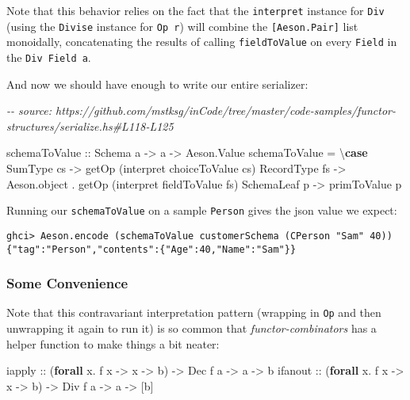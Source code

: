 \documentclass[]{article}
\newenvironment{Shaded}{}{}
\newcommand{\CommentTok}[1]{\textcolor[rgb]{0.38,0.63,0.69}{\textit{#1}}}
\newcommand{\DataTypeTok}[1]{\textcolor[rgb]{0.56,0.13,0.00}{#1}}
\newcommand{\KeywordTok}[1]{\textcolor[rgb]{0.00,0.44,0.13}{\textbf{#1}}}
\newcommand{\NormalTok}[1]{#1}
\newcommand{\OperatorTok}[1]{\textcolor[rgb]{0.40,0.40,0.40}{#1}}
\newcommand{\OtherTok}[1]{\textcolor[rgb]{0.00,0.44,0.13}{#1}}
\begin{document}
Note that this behavior relies on the fact that the \texttt{interpret} instance
for \texttt{Div} (using the \texttt{Divise} instance for \texttt{Op\ r}) will
combine the \texttt{{[}Aeson.Pair{]}} list monoidally, concatenating the results
of calling \texttt{fieldToValue} on every \texttt{Field} in the
\texttt{Div\ Field\ a}.

And now we should have enough to write our entire serializer:

\begin{Shaded}
\begin{Highlighting}[]
\CommentTok{{-}{-} source: https://github.com/mstksg/inCode/tree/master/code{-}samples/functor{-}structures/serialize.hs\#L118{-}L125}

\NormalTok{schemaToValue}
\OtherTok{    ::} \DataTypeTok{Schema}\NormalTok{ a}
    \OtherTok{{-}>}\NormalTok{ a}
    \OtherTok{{-}>} \DataTypeTok{Aeson.Value}
\NormalTok{schemaToValue }\OtherTok{=}\NormalTok{ \textbackslash{}}\KeywordTok{case}
    \DataTypeTok{SumType}\NormalTok{    cs }\OtherTok{{-}>}\NormalTok{ getOp (interpret choiceToValue cs)}
    \DataTypeTok{RecordType}\NormalTok{ fs }\OtherTok{{-}>}\NormalTok{ Aeson.object }\OperatorTok{.}\NormalTok{ getOp (interpret fieldToValue fs)}
    \DataTypeTok{SchemaLeaf}\NormalTok{ p  }\OtherTok{{-}>}\NormalTok{ primToValue p}
\end{Highlighting}
\end{Shaded}

Running our \texttt{schemaToValue} on a sample \texttt{Person} gives the json
value we expect:

\begin{verbatim}
ghci> Aeson.encode (schemaToValue customerSchema (CPerson "Sam" 40))
{"tag":"Person","contents":{"Age":40,"Name":"Sam"}}
\end{verbatim}

\hypertarget{some-convenience}{%
\subsubsection{Some Convenience}\label{some-convenience}}

Note that this contravariant interpretation pattern (wrapping in \texttt{Op} and
then unwrapping it again to run it) is so common that \emph{functor-combinators}
has a helper function to make things a bit neater:

\begin{Shaded}
\begin{Highlighting}[]
\OtherTok{iapply  ::}\NormalTok{ (}\KeywordTok{forall}\NormalTok{ x}\OperatorTok{.}\NormalTok{ f x }\OtherTok{{-}>}\NormalTok{ x }\OtherTok{{-}>}\NormalTok{ b) }\OtherTok{{-}>} \DataTypeTok{Dec}\NormalTok{ f a }\OtherTok{{-}>}\NormalTok{ a }\OtherTok{{-}>}\NormalTok{ b}
\OtherTok{ifanout ::}\NormalTok{ (}\KeywordTok{forall}\NormalTok{ x}\OperatorTok{.}\NormalTok{ f x }\OtherTok{{-}>}\NormalTok{ x }\OtherTok{{-}>}\NormalTok{ b) }\OtherTok{{-}>} \DataTypeTok{Div}\NormalTok{ f a }\OtherTok{{-}>}\NormalTok{ a }\OtherTok{{-}>}\NormalTok{ [b]}
\end{Highlighting}
\end{Shaded}
\end{document}
